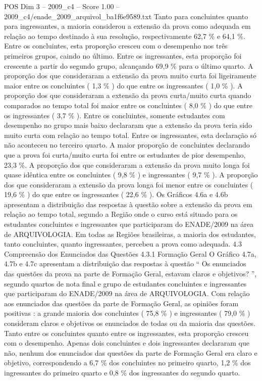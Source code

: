 \begin{textsample}{POS Dim 3 – 2009\_c4 – Score 1.00 – 2009\_c4/enade\_2009\_arquivol\_ba1f6e9589.txt}
Tanto para concluintes quanto para ingressantes, a maioria considerou a extensão da prova como adequada em relação ao tempo destinado à sua resolução, respectivamente 62,7 \% e 64,1 \%.
Entre os concluintes, esta proporção cresceu com o desempenho nos três primeiros grupos, caindo no último.
Entre os ingressantes, esta proporção foi crescente a partir do segundo grupo, alcançando 69,9 \% para o último quarto.
A proporção dos que consideraram a extensão da prova muito curta foi ligeiramente maior entre os concluintes ( 1,3 \% ) do que entre os ingressantes ( 1,0 \% ).
A proporção dos que consideraram a extensão da prova curta/muito curta quando comparados ao tempo total foi maior entre os concluintes ( 8,0 \% ) do que entre os ingressantes ( 3,7 \% ).
Entre os concluintes, somente estudantes com desempenho no grupo mais baixo declararam que a extensão da prova teria sido muito curta com relação ao tempo total.
Entre os ingressantes, esta declaração só não aconteceu no terceiro quarto.
A maior proporção de concluintes declarando que a prova foi curta/muito curta foi entre os estudantes de pior desempenho, 23,3 \%.
A proporção dos que consideraram a extensão da prova muito longa foi quase idêntica entre os concluintes ( 9,8 \% ) e ingressantes ( 9,7 \% ).
A proporção dos que consideraram a extensão da prova longa foi menor entre os concluintes ( 19,6 \% ) do que entre os ingressantes ( 22,6 \% ).
Os Gráficos 4.6a e 4.6b apresentam a distribuição das respostas à questão sobre a extensão da prova em relação ao tempo total, segundo a Região onde o curso está situado para os estudantes concluintes e ingressantes que participaram do ENADE/2009 na área de ARQUIVOLOGIA.
Em todas as Regiões brasileiras, a maioria dos estudantes, tanto concluintes, quanto ingressantes, percebeu a prova como adequada. 4.3 Compreensão dos Enunciados das Questões 4.3.1 Formação Geral O Gráfico 4.7a, 4.7b e 4.7c apresentam a distribuição das respostas à questão “ Os enunciados das questões da prova na parte de Formação Geral, estavam claros e objetivos? ”, segundo quartos de nota final e grupo de estudantes concluintes e ingressantes que participaram do ENADE/2009 na área de ARQUIVOLOGIA.
Com relação aos enunciados das questões da parte de Formação Geral, as opiniões foram positivas : a grande maioria dos concluintes ( 75,8 \% ) e ingressantes ( 79,0 \% ) consideram claros e objetivos os enunciados de todas ou da maioria das questões.
Tanto entre os concluintes quanto entre os ingressantes, esta proporção cresceu com o desempenho.
Apenas dois concluintes e dois ingressantes declararam que não, nenhum dos enunciados das questões da parte de Formação Geral era claro e objetivo, correspondendo a 6,7 \% dos concluintes no primeiro quarto, 1,2 \% dos ingressantes do primeiro quarto e 0,8 \% dos ingressantes do segundo quarto.

\end{textsample}
